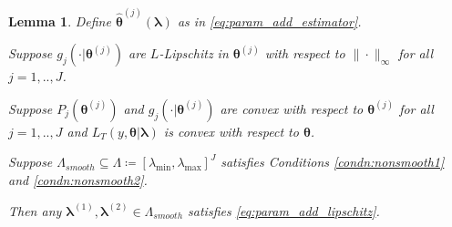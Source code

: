 \documentclass[12pt]{article}
\newtheorem{lemma}{Lemma}
\begin{document}
\begin{lemma}
	\label{lemma:nonsmooth}
		Define $\hat{\boldsymbol{\theta}}^{(j)}\left (\boldsymbol{\lambda}\right )$ as in \eqref{eq:param_add_estimator}.
		
		Suppose $g_j(\cdot| \boldsymbol{\theta}^{(j)})$ are $L$-Lipschitz in $\boldsymbol{\theta}^{(j)}$ with respect to $\| \cdot \|_\infty$ for all $j=1,..,J$.
		
		Suppose $P_j(\boldsymbol{\theta}^{(j)})$ and $g_j(\cdot| \boldsymbol{\theta}^{(j)})$ are convex with respect to $\boldsymbol{\theta}^{(j)}$ for all $j=1,..,J$ and $L_T\left (y, \boldsymbol{\theta} | \boldsymbol{\lambda} \right )$ is convex with respect to $\boldsymbol{\theta}$.
		
		Suppose $\Lambda_{smooth} \subseteq \Lambda \coloneqq \left [ \lambda_{\min}, \lambda_{\max} \right ]^J$ satisfies Conditions \ref{condn:nonsmooth1} and \ref{condn:nonsmooth2}.
		
		Then any $\boldsymbol{\lambda}^{(1)}, \boldsymbol{\lambda}^{(2)} \in \Lambda_{smooth}$ satisfies  \eqref{eq:param_add_lipschitz}.
\end{lemma}
\end{document}
